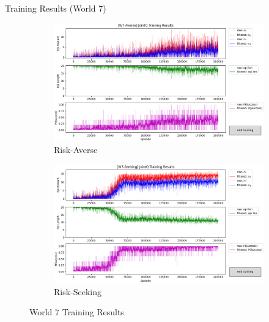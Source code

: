 \documentclass[aspectratio=1610, xcolor=dvipsnames]{packages/beamer}
\begin{document}
 \begin{frame}{Training Results (World 7)}
      \begin{figure}
      \centering
          \begin{subfigure}[b]{\Wfig\textwidth} \centering
              \includegraphics[width=\textwidth]{../results/IDQN_W7//Fig_W7_JointQ_Averse}
              \caption{Risk-Averse} \label{fig:W7averse}
          \end{subfigure}
          \hfill
          \begin{subfigure}[b]{\Wfig\textwidth} \centering
              \includegraphics[width=\textwidth]{../results/IDQN_W7/Fig_W7_JointQ_Seeking}
              \caption{Risk-Seeking} \label{fig:W7seeking}
          \end{subfigure}
     \caption{World 7 Training Results}
     \label{fig:W7}
     \end{figure}
 \end{frame}
\end{document}
